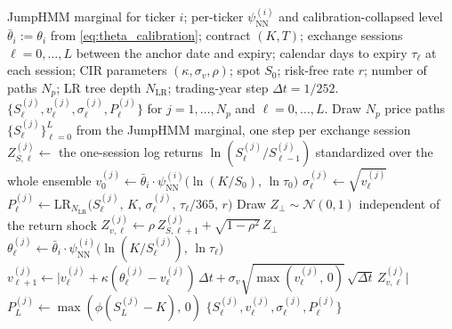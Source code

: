 \begin{algorithm}[ht]
\caption{Forward simulation of path-conditional option premia}\label{alg:forward_sim}
\begin{algorithmic}[1]
\Require JumpHMM marginal for ticker $i$; per-ticker $\psi_{\mathrm{NN}}^{(i)}$ and calibration-collapsed level $\bar\theta_i := \theta_i$ from \eqref{eq:theta_calibration}; contract $(K, T)$; exchange sessions $\ell = 0,\ldots,L$ between the anchor date and expiry; calendar days to expiry $\tau_\ell$ at each session; CIR parameters $(\kappa, \sigma_v, \rho)$; spot $S_0$; risk-free rate $r$; number of paths $N_p$; LR tree depth $N_{\mathrm{LR}}$; trading-year step $\Delta t = 1/252$.
\Ensure $\{S_\ell^{(j)}, v_\ell^{(j)}, \sigma_\ell^{(j)}, P_\ell^{(j)}\}$ for $j = 1,\ldots,N_p$ and $\ell = 0, \ldots, L$.
\State {}
\State Draw $N_p$ price paths $\{S_\ell^{(j)}\}_{\ell=0}^{L}$ from the JumpHMM marginal, one step per exchange session
\State $Z_{S,\ell}^{(j)} \gets$ the one-session log returns $\ln(S_\ell^{(j)}/S_{\ell-1}^{(j)})$ standardized over the whole ensemble
  \State $v_0^{(j)} \gets \bar\theta_i \cdot \psi_{\mathrm{NN}}^{(i)}\!\big(\ln(K/S_0),\, \ln \tau_0\big)$ 
    \State $\sigma_\ell^{(j)} \gets \sqrt{v_\ell^{(j)}}$ 
    \State $P_\ell^{(j)} \gets \mathrm{LR}_{N_{\mathrm{LR}}}\!\big(S_\ell^{(j)},\, K,\, \sigma_\ell^{(j)},\, \tau_\ell/365,\, r\big)$ 
    \State Draw $Z_\perp \sim \mathcal{N}(0,1)$ independent of the return shock
    \State $Z_{v,\ell}^{(j)} \gets \rho\, Z_{S,\ell+1}^{(j)} + \sqrt{1 - \rho^2}\, Z_\perp$ 
    \State $\theta_\ell^{(j)} \gets \bar\theta_i \cdot \psi_{\mathrm{NN}}^{(i)}\!\big(\ln(K/S_\ell^{(j)}),\, \ln \tau_\ell\big)$ 
    \State $v_{\ell+1}^{(j)} \gets \big| v_\ell^{(j)} + \kappa(\theta_\ell^{(j)} - v_\ell^{(j)})\,\Delta t + \sigma_v \sqrt{\max(v_\ell^{(j)},\,0)}\,\sqrt{\Delta t}\, Z_{v,\ell}^{(j)} \big|$
  \EndFor
  \State $P_L^{(j)} \gets \max(\phi (S_L^{(j)} - K),\, 0)$ 
\EndFor
\State \Return $\{S_\ell^{(j)}, v_\ell^{(j)}, \sigma_\ell^{(j)}, P_\ell^{(j)}\}$
\end{algorithmic}
\end{algorithm}

